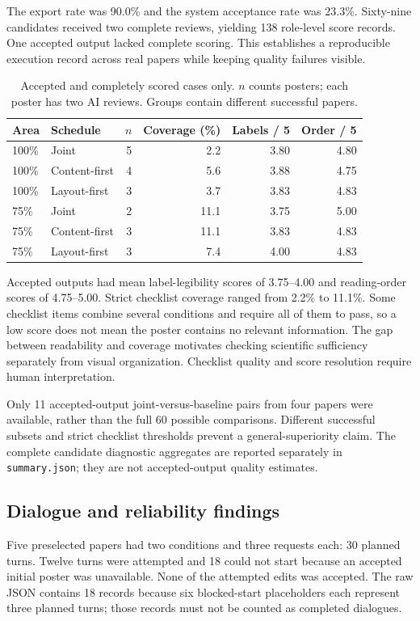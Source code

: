 \documentclass{article}
\begin{document}
The export rate was 90.0\% and the system acceptance rate was 23.3\%. Sixty-nine candidates received two complete reviews, yielding 138 role-level score records. One accepted output lacked complete scoring. This establishes a reproducible execution record across real papers while keeping quality failures visible.

\begin{table}[ht]
\centering\small
\caption{Accepted and completely scored cases only. $n$ counts posters; each poster has two AI reviews. Groups contain different successful papers.}
\label{tab:batch-quality}
\begin{tabular}{llrrrr}
\toprule
Area & Schedule & $n$ & Coverage (\%) & Labels / 5 & Order / 5 \\
\midrule
100\% & Joint & 5 & 2.2 & 3.80 & 4.80 \\
100\% & Content-first & 4 & 5.6 & 3.88 & 4.75 \\
100\% & Layout-first & 3 & 3.7 & 3.83 & 4.83 \\
75\% & Joint & 2 & 11.1 & 3.75 & 5.00 \\
75\% & Content-first & 3 & 11.1 & 3.83 & 4.83 \\
75\% & Layout-first & 3 & 7.4 & 4.00 & 4.83 \\
\bottomrule
\end{tabular}
\end{table}

Accepted outputs had mean label-legibility scores of 3.75--4.00 and reading-order scores of 4.75--5.00. Strict checklist coverage ranged from 2.2\% to 11.1\%. Some checklist items combine several conditions and require all of them to pass, so a low score does not mean the poster contains no relevant information. The gap between readability and coverage motivates checking scientific sufficiency separately from visual organization. Checklist quality and score resolution require human interpretation.

Only 11 accepted-output joint-versus-baseline pairs from four papers were available, rather than the full 60 possible comparisons. Different successful subsets and strict checklist thresholds prevent a general-superiority claim. The complete candidate diagnostic aggregates are reported separately in \texttt{summary.json}; they are not accepted-output quality estimates.

\subsection{Dialogue and reliability findings}
Five preselected papers had two conditions and three requests each: 30 planned turns. Twelve turns were attempted and 18 could not start because an accepted initial poster was unavailable. None of the attempted edits was accepted. The raw JSON contains 18 records because six blocked-start placeholders each represent three planned turns; those records must not be counted as completed dialogues.
\end{document}

